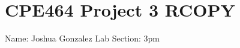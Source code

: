 \chapter{CPE464 Project 3 RCOPY}
\hypertarget{index}{}\label{index}
\label{index_md__2home_2joshua_2Network-Programming-3_2prog3__rcopy_2README}%
%
 Name\+: Joshua Gonzalez Lab Section\+: 3pm 